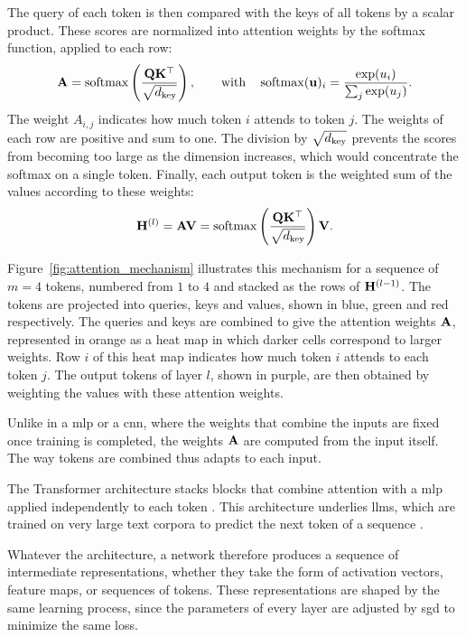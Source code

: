 The query of each token is then compared with the keys of all tokens by a scalar product.
These scores are normalized into attention weights by the softmax function, applied to each row:
\begin{equation}
\mathbf{A} = \operatorname{softmax}\left(\frac{\mathbf{Q}\mathbf{K}^{\top}}{\sqrt{d_{\mathrm{key}}}}\right),
\qquad \text{with} \quad \operatorname{softmax}(\mathbf{u})_i = \frac{\exp(u_i)}{\sum_{j} \exp(u_j)}.
\label{eq:attention_weights}
\end{equation}
The weight $A_{i,j}$ indicates how much token $i$ attends to token $j$.
The weights of each row are positive and sum to one.
The division by $\sqrt{d_{\mathrm{key}}}$ prevents the scores from becoming too large as the dimension increases, which would concentrate the softmax on a single token.
Finally, each output token is the weighted sum of the values according to these weights:
\begin{equation}
\mathbf{H}^{(l)} = \mathbf{A}\mathbf{V} = \operatorname{softmax}\left(\frac{\mathbf{Q}\mathbf{K}^{\top}}{\sqrt{d_{\mathrm{key}}}}\right) \mathbf{V}.
\label{eq:attention}
\end{equation}

Figure~\ref{fig:attention_mechanism} illustrates this mechanism for a sequence of $m = 4$ tokens, numbered from $1$ to $4$ and stacked as the rows of $\mathbf{H}^{(l-1)}$.
The tokens are projected into queries, keys and values, shown in blue, green and red respectively.
The queries and keys are combined to give the attention weights $\mathbf{A}$, represented in orange as a heat map in which darker cells correspond to larger weights.
Row $i$ of this heat map indicates how much token $i$ attends to each token $j$.
The output tokens of layer $l$, shown in purple, are then obtained by weighting the values with these attention weights.



Unlike in a \gls{mlp} or a \gls{cnn}, where the weights that combine the inputs are fixed once training is completed, the weights $\mathbf{A}$ are computed from the input itself.
The way tokens are combined thus adapts to each input.

The Transformer architecture stacks blocks that combine attention with a \gls{mlp} applied independently to each token \parencite{vaswani2017attention}.
This architecture underlies \glspl{llm}, which are trained on very large text corpora to predict the next token of a sequence \parencite{brown2020language}.

Whatever the architecture, a network therefore produces a sequence of intermediate representations, whether they take the form of activation vectors, feature maps, or sequences of tokens.
These representations are shaped by the same learning process, since the parameters of every layer are adjusted by \gls{sgd} to minimize the same loss.
